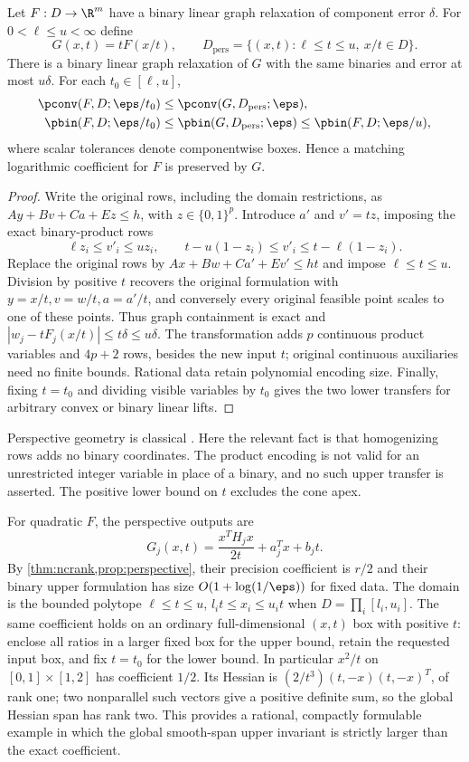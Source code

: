 \begin{proposition}\label{prop:perspective}
Let $F:D\to\R^m$ have a binary linear graph relaxation of component
error $\delta$. For $0<\ell\le u<\infty$ define
\[
 G(x,t)=tF(x/t),\qquad
 D_{\mathrm{pers}}=\{(x,t):\ell\le t\le u,\ x/t\in D\}.
\]
There is a binary linear graph relaxation of $G$ with the same binaries
and error at most $u\delta$. For each $t_0\in[\ell,u]$,
\begin{align*}
 \pconv(F,D;\eps/t_0)&\le\pconv(G,D_{\mathrm{pers}};\eps),\\
 \pbin(F,D;\eps/t_0)&\le\pbin(G,D_{\mathrm{pers}};\eps)
                         \le\pbin(F,D;\eps/u),
\end{align*}
where scalar tolerances denote componentwise boxes. Hence a matching
logarithmic coefficient for $F$ is preserved by $G$.
\end{proposition}
\begin{proof}
Write the original rows, including the domain restrictions, as
$Ay+Bv+Ca+Ez\le h$, with $z\in\{0,1\}^p$.
Introduce $a'$ and $v'=tz$, imposing the exact binary-product rows
\[
 \ell z_i\le v'_i\le uz_i,\qquad
 t-u(1-z_i)\le v'_i\le t-\ell(1-z_i).
\]
Replace the original rows by $Ax+Bw+Ca'+Ev'\le ht$ and impose
$\ell\le t\le u$. Division by positive $t$ recovers the original
formulation with $y=x/t,v=w/t,a=a'/t$, and conversely every original
feasible point scales to one of these points. Thus graph containment
is exact and $|w_j-tF_j(x/t)|\le t\delta\le u\delta$.
The transformation adds $p$ continuous product variables and $4p+2$
rows, besides the new input $t$; original continuous auxiliaries need
no finite bounds. Rational data retain polynomial encoding size.
Finally, fixing $t=t_0$ and dividing visible variables by $t_0$ gives
the two lower transfers for arbitrary convex or binary linear lifts.
\end{proof}

Perspective geometry is classical \citep[Sections 2.3.3 and 3.2.6]{boyd2004}.
Here the relevant fact is that homogenizing rows adds no binary
coordinates. The product encoding is not valid for an unrestricted
integer variable in place of a binary, and no such upper transfer is
asserted. The positive lower bound on $t$ excludes the cone apex.

For quadratic $F$, the perspective outputs are
\[
 G_j(x,t)=\frac{x^TH_jx}{2t}+a_j^Tx+b_jt.
\]
By \cref{thm:ncrank,prop:perspective}, their precision coefficient is
$r/2$ and their binary upper formulation has size
$O(1+\log(1/\eps))$ for fixed data. The domain is the bounded polytope
$\ell\le t\le u$, $l_it\le x_i\le u_it$ when
$D=\prod_i[l_i,u_i]$. The same coefficient holds on an ordinary
full-dimensional $(x,t)$ box with positive $t$: enclose all ratios in
a larger fixed box for the upper bound, retain the requested input
box, and fix $t=t_0$ for the lower bound.
In particular $x^2/t$ on $[0,1]\times[1,2]$ has coefficient $1/2$.
Its Hessian is $(2/t^3)(t,-x)(t,-x)^T$, of rank one; two nonparallel
such vectors give a positive definite sum, so the global Hessian
span has rank two. This provides a rational, compactly formulable
example in which the global smooth-span upper invariant is strictly
larger than the exact coefficient.
